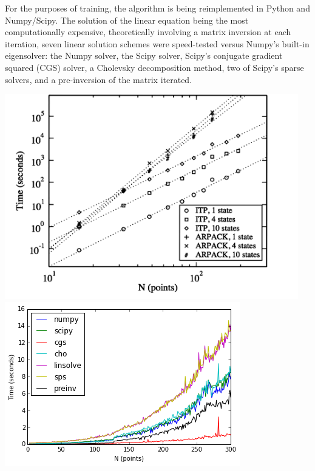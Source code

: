 \documentclass[a0b,landscape]{a0poster}
\begin{document}
\begin{multicols}{3}
For the purposes of training, the algorithm is being reimplemented in Python and Numpy/Scipy. The solution of the linear equation being the most computationally expensive, theoretically involving a matrix inversion at each iteration, seven linear solution schemes were speed-tested versus Numpy's built-in eigensolver: the Numpy solver, the Scipy solver, Scipy's conjugate gradient squared (CGS) solver, a Cholevsky decomposition method, two of Scipy's sparse solvers, and a pre-inversion of the matrix iterated. 
\begin{center}\vspace{1cm}
\includegraphics[width=\linewidth]{itpvlanc.png}
\endminipage\hfill
{}
\includegraphics[width=\linewidth]{analysis_9_1.png}

\end{center}
\end{multicols}
\end{document}
